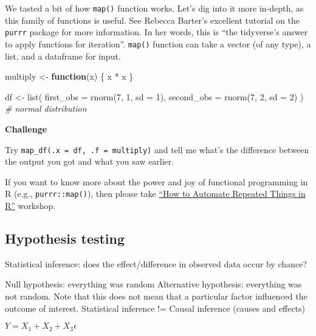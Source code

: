 \documentclass[
]{book}
\newenvironment{Shaded}{\begin{snugshade}}{\end{snugshade}}
\newcommand{\AttributeTok}[1]{\textcolor[rgb]{0.77,0.63,0.00}{#1}}
\newcommand{\CommentTok}[1]{\textcolor[rgb]{0.56,0.35,0.01}{\textit{#1}}}
\newcommand{\ControlFlowTok}[1]{\textcolor[rgb]{0.13,0.29,0.53}{\textbf{#1}}}
\newcommand{\DecValTok}[1]{\textcolor[rgb]{0.00,0.00,0.81}{#1}}
\newcommand{\FunctionTok}[1]{\textcolor[rgb]{0.00,0.00,0.00}{#1}}
\newcommand{\NormalTok}[1]{#1}
\newcommand{\OtherTok}[1]{\textcolor[rgb]{0.56,0.35,0.01}{#1}}
\newcommand{\SpecialCharTok}[1]{\textcolor[rgb]{0.00,0.00,0.00}{#1}}
\begin{document}
We tasted a bit of how \texttt{map()} function works. Let's dig into it more in-depth, as this family of functions is useful. See Rebecca Barter's excellent tutorial on the \texttt{purrr} package for more information. In her words, this is ``the tidyverse's answer to apply functions for iteration''. \texttt{map()} function can take a vector (of any type), a list, and a dataframe for input.

\begin{Shaded}
\begin{Highlighting}[]
\NormalTok{multiply }\OtherTok{\textless{}{-}} \ControlFlowTok{function}\NormalTok{(x) \{}
\NormalTok{  x }\SpecialCharTok{*}\NormalTok{ x}
\NormalTok{\}}

\NormalTok{df }\OtherTok{\textless{}{-}} \FunctionTok{list}\NormalTok{(}
  \AttributeTok{first\_obs =} \FunctionTok{rnorm}\NormalTok{(}\DecValTok{7}\NormalTok{, }\DecValTok{1}\NormalTok{, }\AttributeTok{sd =} \DecValTok{1}\NormalTok{),}
  \AttributeTok{second\_obs =} \FunctionTok{rnorm}\NormalTok{(}\DecValTok{7}\NormalTok{, }\DecValTok{2}\NormalTok{, }\AttributeTok{sd =} \DecValTok{2}\NormalTok{)}
\NormalTok{) }\CommentTok{\# normal distribution}
\end{Highlighting}
\end{Shaded}

\textbf{Challenge}

Try \texttt{map\_df(.x\ =\ df,\ .f\ =\ multiply)} and tell me what's the difference between the output you got and what you saw earlier.

If you want to know more about the power and joy of functional programming in R (e.g., \texttt{purrr::map()}), then please take \href{https://github.com/dlab-berkeley/R-functional-programming}{``How to Automate Repeated Things in R''} workshop.

\hypertarget{hypothesis-testing}{%
\subsection{Hypothesis testing}\label{hypothesis-testing}}

Statistical inference: does the effect/difference in observed data occur by chance?

Null hypothesis: everything was random
Alternative hypothesis: everything was not random. Note that this does not mean that a particular factor influenced the outcome of interest. Statistical inference != Causal inference (causes and effects)

\(Y = X_{1} + X_{2} + X_{3} \epsilon\)
\end{document}
